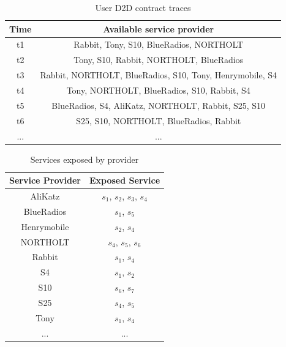 \documentclass[journal]{IEEEtran}
\begin{document}
\begin{table}[!t]
\renewcommand{\arraystretch}{1.5}
\caption{User D2D contract traces}
\label{D2D contract traces}
\centering
\begin{tabular}{c c}
\hline
\bfseries Time & \bfseries Available service provider\\
\hline
t1 & Rabbit, Tony, S10, BlueRadios, NORTHOLT\\
t2 & Tony, S10, Rabbit, NORTHOLT, BlueRadios\\
t3 & Rabbit, NORTHOLT, BlueRadios, S10, Tony, Henrymobile, S4 \\
t4 & Tony, NORTHOLT, BlueRadios, S10, Rabbit, S4\\
t5 & BlueRadios, S4, AliKatz, NORTHOLT, Rabbit, S25, S10\\
t6 & S25, S10, NORTHOLT, BlueRadios, Rabbit\\
... & ...\\
\hline
\end{tabular}
\end{table}

\begin{table}[!t]
\renewcommand{\arraystretch}{1.3}
\caption{Services exposed by provider}
\label{Services exposed by provider}
\centering
\begin{tabular}{c c}
\hline
\bfseries Service Provider & \bfseries Exposed Service\\
\hline
AliKatz     & $s_1$, $s_2$, $s_3$, $s_4$\\
BlueRadios  & $s_1$, $s_5$\\
Henrymobile & $s_2$, $s_4$\\
NORTHOLT    & $s_4$, $s_5$, $s_6$ \\
Rabbit      & $s_1$, $s_4$\\
S4          & $s_1$, $s_2$\\
S10         & $s_6$, $s_7$\\
S25         & $s_4$, $s_5$\\
Tony        & $s_1$, $s_4$\\
... & ...\\
\hline
\end{tabular}
\end{table}
\end{document}
